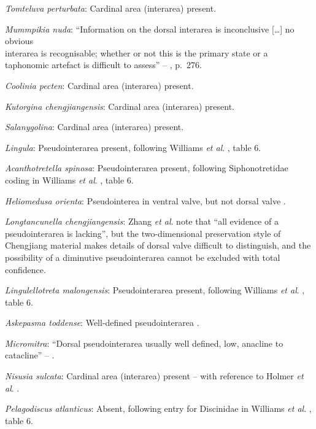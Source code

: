 \documentclass[]{book}
\theoremstyle{definition}
\theoremstyle{definition}
\theoremstyle{definition}
\theoremstyle{remark}
\begin{document}
\emph{Tomteluva perturbata}: Cardinal area (interarea) present.

\emph{Mummpikia nuda}: ``Information on the dorsal interarea is
inconclusive {[}\ldots{}{]} no obvious\\
interarea is recognisable; whether or not this is the primary state or a
taphonomic artefact is difficult to assess'' --
\citet{Balthasar2008iMummpikia}, p.~276.

\emph{Coolinia pecten}: Cardinal area (interarea) present.

\emph{Kutorgina chengjiangensis}: Cardinal area (interarea) present.

\emph{Salanygolina}: Cardinal area (interarea) present.

\emph{Lingula}: Pseudointerarea present, following Williams \emph{et
al}. \citeyearpar{Williams2000BrachiopodaLinguliformea}, table 6.

\emph{Acanthotretella spinosa}: Pseudointerarea present, following
Siphonotretidae coding in Williams \emph{et al}.
\citeyearpar{Williams2000BrachiopodaLinguliformea}, table 6.

\emph{Heliomedusa orienta}: Pseudointerea in ventral valve, but not
dorsal valve \citep[2007]{Williams2000BrachiopodaLinguliformea}.

\emph{Longtancunella chengjiangensis}: Zhang \emph{et al}.
\citeyearpar{Zhang2011Theexceptionally} note that ``all evidence of a
pseudointerarea is lacking'', but the two-dimensional preservation style
of Chengjiang material makes details of dorsal valve difficult to
distinguish, and the possibility of a diminutive pseudointerarea cannot
be excluded with total confidence.

\emph{Lingulellotreta malongensis}: Pseudointerarea present, following
Williams \emph{et al}.
\citeyearpar{Williams2000BrachiopodaLinguliformea}, table 6.

\emph{Askepasma toddense}: Well-defined pseudointerarea
\citep[p153]{Williams2000BrachiopodaLinguliformea}.

\emph{Micromitra}: ``Dorsal pseudointerarea usually well defined, low,
anacline to catacline'' -- \citet{Williams2000BrachiopodaLinguliformea}.

\emph{Nisusia sulcata}: Cardinal area (interarea) present -- with
reference to Holmer \emph{et al}.
\citeyearpar{Holmer2018Evolutionarysignificance}.

\emph{Pelagodiscus atlanticus}: Absent, following entry for Discinidae
in Williams \emph{et al}.
\citeyearpar{Williams2000BrachiopodaLinguliformea}, table 6.
\end{document}

